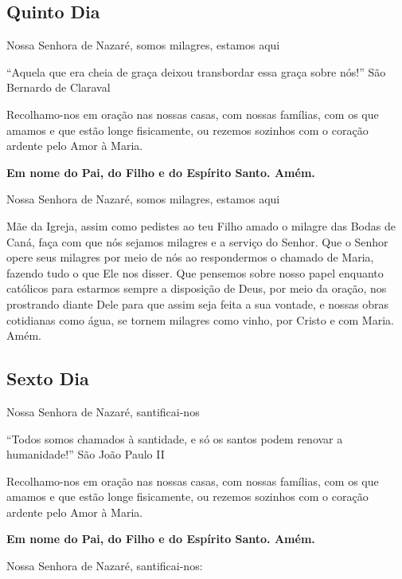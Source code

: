 \documentclass[a4paper,14pt]{extarticle} \usepackage[utf8]{inputenc}
\begin{document}
\textbf{}

\subsection{Quinto Dia}

\textbf{}

Nossa Senhora de Nazaré, somos milagres, estamos aqui

“Aquela que era cheia de graça deixou transbordar essa graça sobre nós!” São Bernardo de Claraval

Recolhamo-nos em oração nas nossas casas, com nossas famílias, com os que amamos e que estão longe fisicamente, ou rezemos sozinhos com o coração ardente pelo Amor à Maria.

\textbf{Em nome do Pai, do Filho e do Espírito Santo. Amém.}

Nossa Senhora de Nazaré, somos milagres, estamos aqui

Mãe da Igreja, assim como pedistes ao teu Filho amado o milagre das Bodas de Caná, faça com que nós sejamos milagres e a serviço do Senhor. Que o Senhor opere seus milagres por meio de nós ao respondermos o chamado de Maria, fazendo tudo o que Ele nos disser. Que pensemos sobre nosso papel enquanto católicos para estarmos sempre a disposição de Deus, por meio da oração, nos prostrando diante Dele para que assim seja feita a sua vontade, e nossas obras cotidianas como água, se tornem milagres como vinho, por Cristo e com Maria. Amém.

\textbf{}

\subsection{Sexto Dia}

\textbf{}

Nossa Senhora de Nazaré, santificai-nos

“Todos somos chamados à santidade, e só os santos podem renovar a humanidade!” São João Paulo II

Recolhamo-nos em oração nas nossas casas, com nossas famílias, com os que amamos e que estão longe fisicamente, ou rezemos sozinhos com o coração ardente pelo Amor à Maria.

\textbf{Em nome do Pai, do Filho e do Espírito Santo. Amém.}

Nossa Senhora de Nazaré, santificai-nos:
\end{document}
